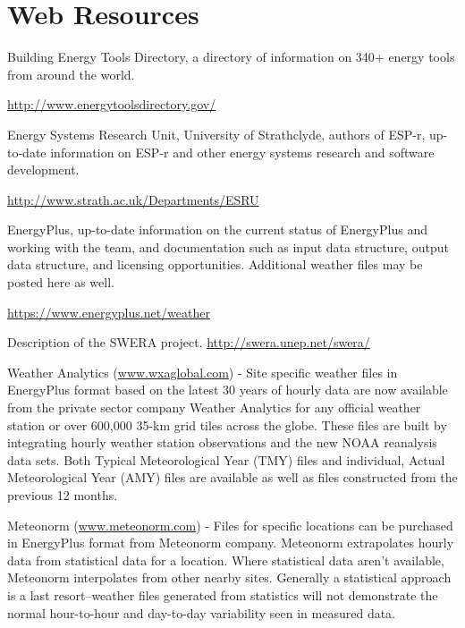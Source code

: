 \section{Web Resources}\label{web-resources}

Building Energy Tools Directory, a directory of information on 340+ energy tools from around the world.

\url{http://www.energytoolsdirectory.gov/}

Energy Systems Research Unit, University of Strathclyde, authors of ESP-r, up-to-date information on ESP-r and other energy systems research and software development.

\url{http://www.strath.ac.uk/Departments/ESRU}

EnergyPlus, up-to-date information on the current status of EnergyPlus and working with the team, and documentation such as input data structure, output data structure, and licensing opportunities. Additional weather files may be posted here as well.

\url{https://www.energyplus.net/weather}

Description of the SWERA project. \url{http://swera.unep.net/swera/}

Weather Analytics (\href{http://www.wxaglobal.com}{www.wxaglobal.com}) - Site specific weather files in EnergyPlus format based on the latest 30 years of hourly data are now available from the private sector company Weather Analytics for any official weather station or over 600,000 35-km grid tiles across the globe. These files are built by integrating hourly weather station observations and the new NOAA reanalysis data sets. Both Typical Meteorological Year (TMY) files and individual, Actual Meteorological Year (AMY) files are available as well as files constructed from the previous 12 months.

Meteonorm (\href{http://www.meteonorm.com}{www.meteonorm.com}) - Files for specific locations can be purchased in EnergyPlus format from Meteonorm company. Meteonorm extrapolates hourly data from statistical data for a location. Where statistical data aren't available, Meteonorm interpolates from other nearby sites. Generally a statistical approach is a last resort--weather files generated from statistics will not demonstrate the normal hour-to-hour and day-to-day variability seen in measured data.
